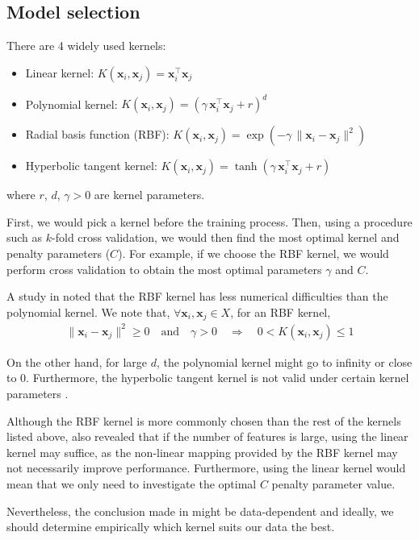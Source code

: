 \documentclass[12pt, twoside, a4paper]{report}
\def\vec{\boldsymbol}
\begin{document}
\subsection{Model selection} \label{bg:ml:svm:model}
There are 4 widely used kernels:
\begin{itemize}
\item Linear kernel: $K(\vec{x}_i, \vec{x}_j) = \vec{x}_i^\top \vec{x}_j$
\item Polynomial kernel: $K(\vec{x}_i, \vec{x}_j) = (\gamma \, \vec{x}_i^\top \vec{x}_j + r)^d$
\item Radial basis function (RBF): $K(\vec{x}_i, \vec{x}_j) = \exp(-\gamma \, \| \vec{x}_i - \vec{x}_j \|^2)$
\item Hyperbolic tangent kernel: $K(\vec{x}_i, \vec{x}_j) = \tanh(\gamma \, \vec{x}_i^\top \vec{x}_j + r)$
\end{itemize}
where $r$, $d$, $\gamma>0$ are kernel parameters.

First, we would pick a kernel before the training process. Then, using a procedure such as $k$-fold cross validation, we would then find the most optimal kernel and penalty parameters ($C$). For example, if we choose the RBF kernel, we would  perform cross validation to obtain the most optimal parameters $\gamma$ and $C$.

A study in \cite{RefWorks:128} noted that the RBF kernel has less numerical difficulties than the polynomial kernel. We note that, $\forall \vec{x}_i, \vec{x}_j \in X$, for an RBF kernel,
\begin{align*}
\| \vec{x}_i - \vec{x}_j \|^2 \geq 0 \quad \text{and} \quad \gamma > 0 \quad \Rightarrow \quad 0 < K(\vec{x}_i, \vec{x}_j) \leq 1 
\end{align*}

On the other hand, for large $d$, the polynomial kernel might go to infinity or close to 0. Furthermore, the hyperbolic tangent kernel is not valid under certain kernel parameters \cite{RefWorks:254}.

Although the RBF kernel is more commonly chosen than the rest of the kernels listed above, \cite{RefWorks:128} also revealed that if the number of features is large, using the linear kernel may suffice, as the non-linear mapping provided by the RBF kernel may not necessarily improve performance. Furthermore, using the linear kernel would mean that we only need to investigate the optimal $C$ penalty parameter value.

Nevertheless, the conclusion made in \cite{RefWorks:128} might be data-dependent and ideally, we should determine empirically which kernel suits our data the best.
\end{document}
